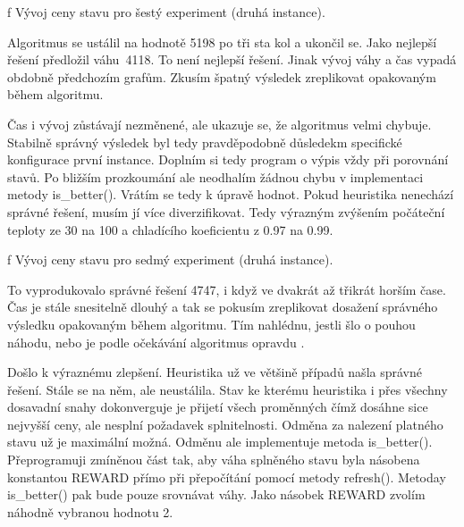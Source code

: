\centerline{ \picwidth=15cm  }
\caption/f Vývoj ceny stavu pro šestý experiment (druhá instance).
\bigskip
\vfill\break

Algoritmus se ustálil na hodnotě 5198 po tři sta kol a ukončil se. Jako nejlepší řešení předložil váhu~4118. To není nejlepší řešení. Jinak vývoj váhy a čas vypadá obdobně předchozím grafům. Zkusím špatný výsledek zreplikovat opakovaným během algoritmu.

\bigskip
\centerline{}\bigskip

Čas i vývoj zůstávají nezměnené, ale ukazuje se, že algoritmus velmi chybuje. Stabilně správný výsledek byl tedy pravděpodobně důsledekm specifické konfigurace první instance. Doplním si tedy program o výpis vždy při porovnání stavů. Po bližším prozkoumání ale neodhalím žádnou chybu v implementaci metody is\_better(). Vrátím se tedy k úpravě hodnot. Pokud heuristika nenechází správné řešení, musím jí více diverzifikovat. Tedy výrazným zvýšením počáteční teploty ze 30 na 100 a chladícího koeficientu z 0.97 na 0.99.

\centerline{ \picwidth=15cm  }
\caption/f Vývoj ceny stavu pro sedmý experiment (druhá instance).
\bigskip

To vyprodukovalo správné řešení 4747, i když ve dvakrát až třikrát horším čase. Čas je stále snesitelně dlouhý a tak se pokusím zreplikovat dosažení správného výsledku opakovaným během algoritmu. Tím nahlédnu, jestli šlo o pouhou náhodu, nebo je podle očekávání algoritmus opravdu .

\bigskip
\centerline{}\bigskip

Došlo k výraznému zlepšení. Heuristika už ve většině případů našla správné řešení. Stále se na něm, ale neustálila. Stav ke kterému heuristika i přes všechny dosavadní snahy dokonverguje je přijetí všech proměnných čímž dosáhne sice nejvyšší ceny, ale nesplní požadavek splnitelnosti. Odměna za nalezení platného stavu už je maximální možná. Odměnu ale implementuje metoda is\_better(). Přeprogramuji zmíněnou část tak, aby váha splněného stavu byla násobena konstantou REWARD přímo při přepočítání pomocí metody refresh(). Metoday is\_better() pak bude pouze srovnávat váhy. Jako násobek REWARD zvolím náhodně vybranou hodnotu 2.

